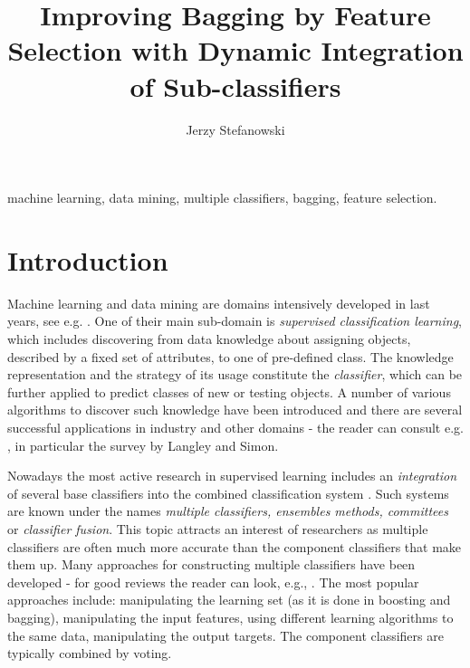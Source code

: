 \documentclass[runningheads]{llncs}
\title{Improving Bagging by Feature Selection with Dynamic Integration
of Sub-classifiers}
\author{Jerzy Stefanowski}
\institute{Institute of Computing Science, Pozna\'{n} University of
Technology,\\ ul. Piotrowo 3A, 60--965 Pozna\'{n}, Poland,\\
\email{Jerzy.Stefanowski@cs.put.poznan.pl}}
\begin{document}
\maketitle



 machine learning, data mining, multiple
classifiers, bagging, feature selection.


\section{Introduction}

Machine learning and data mining are domains intensively developed in last
years, see e.g. \cite{MBK98}. One of their main sub-domain is {\em
supervised classification learning}, which includes discovering from data
knowledge about assigning objects, described by a fixed set of attributes,
to one of pre-defined class. The knowledge representation and the strategy
of its usage constitute the {\em classifier}, which can be further applied
to predict classes of new or testing objects. A number of various algorithms
to discover such knowledge have been introduced and there are several
successful applications in industry and other domains - the  reader can
consult e.g. \cite{MBK98}, in particular the survey
 by Langley and Simon.

Nowadays the most active research in supervised learning includes an {\em
integration} of several base classifiers into the combined classification
system \cite{Dietrich,Kunchevabook,Valenti}. Such systems are known under
the names {\em multiple classifiers, ensembles methods, committees} or {\em
classifier fusion}. This topic attracts an interest of researchers as
multiple classifiers are often much more accurate than the component
classifiers that make them up. Many approaches for constructing  multiple
classifiers have been developed - for good reviews the reader can look,
e.g., \cite{Dietrich,Kunchevabook,Valenti}. The most popular approaches
include: manipulating the learning set (as it is done in boosting and
bagging), manipulating the input features, using different learning
algorithms to the same data, manipulating the output targets. The component
classifiers are typically combined by voting.
\end{document}
